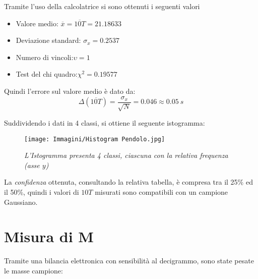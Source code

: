 \documentclass[12pt, a4paper]{article}
\begin{document}
\addvspace{3cm}

Tramite l'uso della calcolatrice si sono ottenuti i seguenti valori\begin{itemize}

\bigskip

    \item\phantom{asd} Valore medio:\phantom{aaaaaaaaa.aaaaa}
          $\overline{x}=\overline{10T}=21.18633$
\\
      
    \item\phantom{asd} Deviazione standard:\phantom{aaaaaaaa}
        $\sigma_x=0.2537$
\\

     \item\phantom{asd} Numero di vincoli:\phantom{aaaaaaaaaaa}$\upsilon=1$
\\

 \item\phantom{asd} Test del chi quadro:\phantom{aaaaaaaaaa}$\chi^2=0.19577$
    
\end{itemize}
\bigskip

Quindi l'errore sul valore medio è dato da:
\begin{equation*}
    \Delta (\overline{10T})=\frac{\sigma_x}{\sqrt{N}}=0.046\approx 0.05\ s
\end{equation*}

\newpage

Suddividendo i dati in 4 classi, si ottiene il seguente istogramma:
\bigskip

    \begin{figure}[h!]
\centering
\texttt{[image: Immagini/Histogram Pendolo.jpg]}
\caption{\textit{{\footnotesize{L'Istogramma presenta 4 classi, ciascuna con la relativa frequenza (asse $y$) }}}}
\label{Grafico parabolico}
\end{figure}


\bigskip
\addvspace{1.5cm}
La \textit{confidenza} ottenuta, consultando la relativa tabella, è compresa tra il 25\% ed il 50\%, quindi i valori di $10T$ misurati sono compatibili con un campione Gaussiano.

\newpage

\section{Misura di M}
Tramite una bilancia elettronica con sensibilità al decigrammo, sono state pesate le masse campione:
\end{document}
